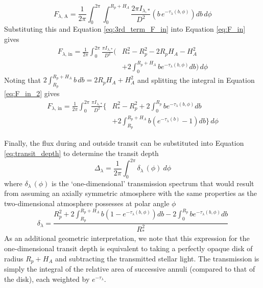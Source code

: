 \documentclass[fleqn,usenatbib]{mnras}
\begin{document}
%
\begin{equation}
F_{\lambda, \, \mathrm{A}} = \frac{1}{2\pi} \int_{0}^{2\pi} \int_{0}^{R_p + H_A} \frac{2\pi I_{\lambda,*}}{D^2} \left(b \, e^{-\tau_{\lambda}(b, \phi)}\right) db \, d\phi
\label{eq:2nd_term_F_in}
\end{equation}
%
Substituting this and Equation \ref{eq:3rd_term_F_in} into Equation \ref{eq:F_in} gives
%
\begin{equation}
\begin{split}
F_{\lambda,\, \mathrm{in}} = \frac{1}{2\pi} \int_{0}^{2\pi} \frac{\pi I_{\lambda,*}}{D^2} \bigg( & R_{*}^2 - R_{p}^2 -2R_p H_A - H_{A}^2 \\
& + 2 \int_{0}^{R_p+ H_A} b e^{-\tau_{\lambda}(b, \phi)} db \bigg) \, d\phi
\label{eq:F_in_2}
\end{split}
\end{equation}
%
Noting that $2 \int_{R_p}^{R_p + H_A} b \, db = 2R_p H_A + H_{A}^2$ and splitting the integral in Equation \ref{eq:F_in_2} gives
%
\begin{equation}
\begin{split}
F_{\lambda,\, \mathrm{in}} = \frac{1}{2\pi} \int_{0}^{2\pi} \frac{\pi I_{\lambda,*}}{D^2} \bigg\{ & R_{*}^2 - R_{p}^2 + 2 \int_{0}^{R_p} b e^{-\tau_{\lambda}(b, \phi)} db \\
&  + 2 \int_{R_p}^{R_p+ H_A} b \left(e^{-\tau_{\lambda}(b)} -1\right) db \bigg\} \, d\phi
\label{eq:F_in_3}
\end{split}
\end{equation}

Finally, the flux during and outside transit can be substituted into Equation \ref{eq:transit_depth} to determine the transit depth
%
\begin{equation}
\Delta_{\lambda} = \frac{1}{2 \pi} \int_{0}^{2 \pi} \delta_{\lambda}\, (\phi) ~ d \phi
\label{eq:Delta}
\end{equation}
%
where $\delta_{\lambda}\, (\phi)$ is the `one-dimensional' transmission spectrum that would result from assuming an axially symmetric atmosphere with the same properties as the two-dimensional atmosphere possesses at polar angle $\phi$ 
\begin{equation}
\delta_{\lambda} = \frac{R_{p}^2 + 2 \displaystyle\int_{R_p}^{R_p+ H_A} b \left(1 - e^{-\tau_{\lambda}(b, \phi)} \right) db - 2 \displaystyle\int_{0}^{R_p} b e^{-\tau_{\lambda}(b, \phi)} db}{R_{*}^2}
\label{eq:delta}
\end{equation}
%
As an additional geometric interpretation, we note that this expression for the one-dimensional transit depth is equivalent to taking a perfectly opaque disk of radius $R_p + H_A$ and subtracting the transmitted stellar light. The transmission is simply the integral of the relative area of successive annuli (compared to that of the disk), each weighted by $e^{-\tau_{\lambda}}$.



\bsp	%
\label{lastpage}
\end{document}
